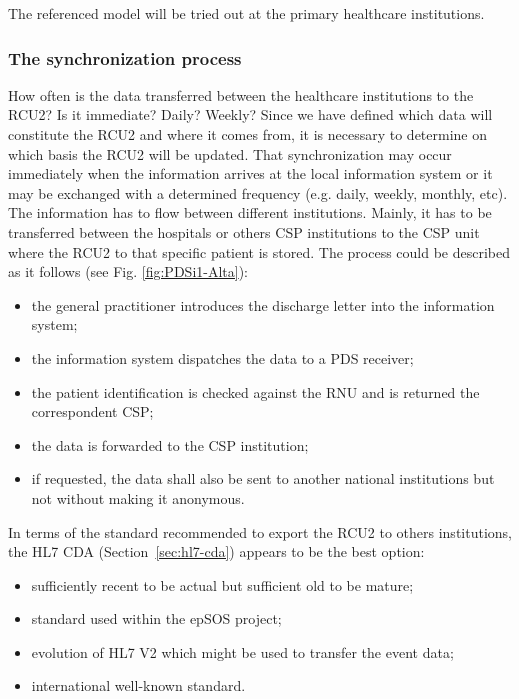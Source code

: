 The referenced model will be tried out at the primary healthcare institutions.


\subsubsection{The synchronization process}

How often is the data transferred between the healthcare institutions to the RCU2? Is it immediate? Daily? Weekly? Since we have defined which data will constitute the RCU2 and where it comes from, it is necessary to determine on which basis the RCU2 will be updated. That synchronization may occur immediately when the information arrives at the local information system or it may be exchanged with a determined frequency (e.g. daily, weekly, monthly, etc).
The information has to flow between different institutions. Mainly, it has to be transferred between the hospitals or others CSP institutions to the CSP unit where the RCU2 to that specific patient is stored. The process could be described as it follows (see Fig. \ref{fig:PDSi1-Alta}):

\begin{itemize}
\item the general practitioner introduces the discharge letter into the information system;
\item the information system dispatches the data to a PDS receiver;
\item the patient identification is checked against the RNU and is returned the correspondent CSP;
\item the data is forwarded to the CSP institution;
\item if requested, the data shall also be sent to another national institutions but not without making it anonymous.
\end{itemize}

In terms of the standard recommended to export the RCU2 to others institutions, the HL7 CDA (Section~\ref{sec:hl7-cda}) appears to be the best option:
\begin{itemize}
\item sufficiently recent to be actual but sufficient old to be mature;
\item standard used within the epSOS project;
\item evolution of HL7 V2 which might be used to transfer the event data;
\item international well-known standard.
\end{itemize}

